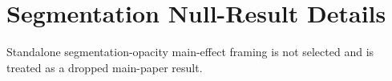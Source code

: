 \section{Segmentation Null-Result Details}
Standalone segmentation-opacity main-effect framing is not selected and is treated as a dropped main-paper result.
